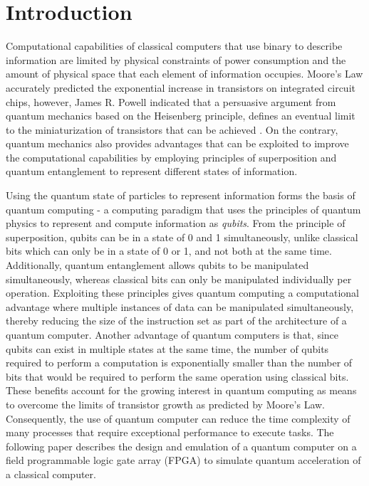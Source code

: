 \documentclass[class=report,11pt,crop=false]{standalone}
\begin{document}
\chapter{Introduction}


Computational capabilities of classical computers that use binary to describe information are limited by physical constraints of power consumption and the amount of physical space that each element of information occupies. Moore's Law accurately predicted the exponential increase in transistors on integrated circuit chips, however, James R. Powell indicated that a persuasive argument from quantum mechanics based on the Heisenberg principle, defines an eventual limit to the miniaturization of transistors that can be achieved \cite{powell2008}. On the contrary, quantum mechanics also provides advantages that can be exploited to improve the computational capabilities by employing principles of superposition and quantum entanglement to represent different states of information. 

Using the quantum state of particles to represent information forms the basis of quantum computing - a computing paradigm that uses the principles of quantum physics to represent and compute information as \textit{qubits}. From the principle of superposition, qubits can be in a state of 0 and 1 simultaneously, unlike classical bits which can only be in a state of 0 or 1, and not both at the same time. Additionally, quantum entanglement allows qubits to be manipulated simultaneously, whereas classical bits can only be manipulated individually per operation. Exploiting these principles gives quantum computing a computational advantage where multiple instances of data can be manipulated simultaneously, thereby reducing the size of the instruction set as part of the architecture of a quantum computer. Another advantage of quantum computers is that, since qubits can exist in multiple states at the same time, the number of qubits required to perform a computation is exponentially smaller than the number of bits that would be required to perform the same operation using classical bits. These benefits account for the growing interest in quantum computing as means to overcome the limits of transistor growth as predicted by Moore's Law. Consequently, the use of quantum computer can reduce the time complexity of many processes that require exceptional performance to execute tasks. The following paper describes the design and emulation of a quantum computer on a field programmable logic gate array (FPGA) to simulate quantum acceleration of a classical computer. 
\end{document}
